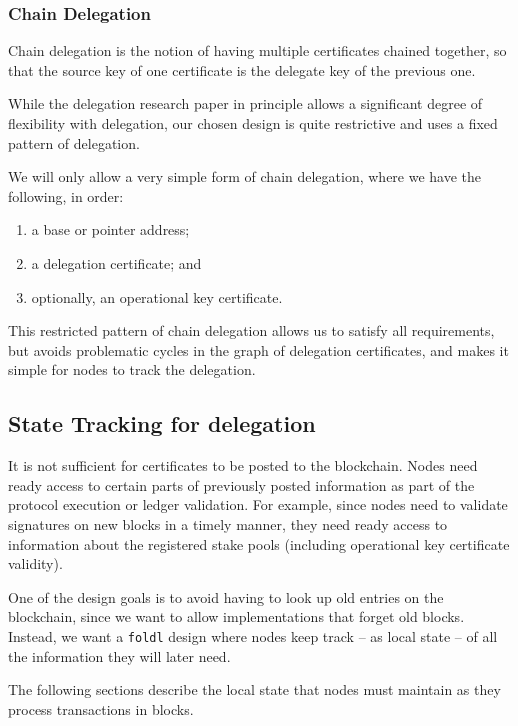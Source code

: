 \documentclass[11pt,a4paper]{article}
\begin{document}
\subsubsection{Chain Delegation}
\label{chain-delegation}

Chain delegation is the notion of having multiple certificates chained
together, so that the source key of one certificate is the delegate key
of the previous one.

While the delegation research paper in principle allows a significant
degree of flexibility with delegation, our chosen design is quite
restrictive and uses a fixed pattern of delegation.

We will only allow a very simple form of chain delegation, where we have
the following, in order:

\begin{enumerate}
\item
  a base or pointer address;
\item
  a delegation certificate; and
\item
  optionally, an operational key certificate.
\end{enumerate}

This restricted pattern of chain delegation allows us to satisfy all
requirements, but avoids problematic cycles in the graph of delegation
certificates, and makes it simple for nodes to track the delegation.

\subsection{State Tracking for delegation}
\label{state-tracking-for-delegation}

It is not sufficient for certificates to be posted to the blockchain.
Nodes need ready access to certain parts of previously posted
information as part of the protocol execution or ledger validation. For
example, since nodes need to validate signatures on new blocks in a
timely manner, they need ready access to information about the registered
stake pools (including operational key certificate validity).

One of the design goals is to avoid having to look up old entries on the
blockchain, since we want to allow implementations that forget old
blocks. Instead, we want a {\tt foldl} design where nodes keep track -- as
local state -- of all the information they will later need.

The following sections describe the local state that nodes must maintain
as they process transactions in blocks.
\end{document}
